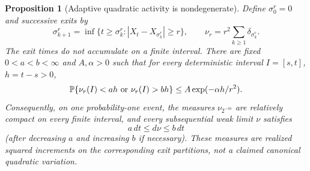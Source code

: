\documentclass[11pt]{article}
\newtheorem{proposition}[theorem]{Proposition}
\theoremstyle{definition}\newtheorem{definition}[theorem]{Definition}
\theoremstyle{remark}\newtheorem{remark}[theorem]{Remark}
\begin{document}
\begin{proposition}[Adaptive quadratic activity is nondegenerate]
\label{prop:adaptive-quadratic-activity}
Define $\sigma^r_0=0$ and successive exits by
\[
 \sigma^r_{k+1}=\inf\{t\ge\sigma^r_k:
                   |X_t-X_{\sigma^r_k}|\ge r\},\qquad
 \nu_r=r^2\sum_{k\ge1}\delta_{\sigma^r_k}.
\]
The exit times do not accumulate on a finite interval. There are fixed
$0<a<b<\infty$ and $A,\alpha>0$ such that for every deterministic
interval $I=[s,t]$, $h=t-s>0$,
\[
 \mathbb P\{\nu_r(I)<ah\ \hbox{or}\ \nu_r(I)>bh\}
       \le A\exp(-\alpha h/r^2).
 \label{eq:exit-count-concentration}
\]
Consequently, on one probability-one event, the measures
$\nu_{2^{-m}}$ are relatively compact on every finite interval, and
every subsequential weak limit $\nu$ satisfies
\[
 a\,dt\le d\nu\le b\,dt
 \label{eq:adaptive-clock-density}
\]
(after decreasing $a$ and increasing $b$ if necessary).
These measures are realized squared increments on the corresponding
exit partitions, not a claimed canonical quadratic variation.
\end{proposition}
\end{document}
